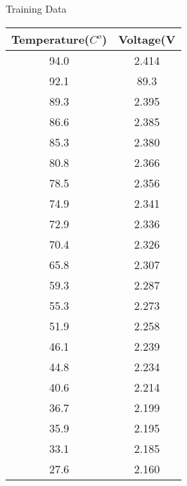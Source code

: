 \documentclass[journal,12pt,onecolumn]{IEEEtran}
\author{EE25BTECH11025\_EE25BTECH11023}
\begin{document}
\maketitle
\begin{center}
Training Data\\
\vspace{0.3cm}
\begin{tabular}[12pt]{|c|c|}
\hline
Temperature($C^o$)&Voltage(V\\
\hline
94.0&2.414\\
\hline
92.1&89.3\\
\hline
89.3&2.395\\
\hline
86.6&2.385\\
\hline
85.3&2.380\\
\hline
80.8&2.366\\
\hline
78.5&2.356\\
\hline
74.9&2.341\\
\hline
72.9&2.336\\
\hline
70.4&2.326\\
\hline
65.8&2.307\\
\hline
59.3&2.287\\
\hline
55.3&2.273\\
\hline
51.9&2.258\\
\hline
46.1&2.239\\
\hline
44.8&2.234\\
\hline
40.6&2.214\\
\hline
36.7&2.199\\
\hline
35.9&2.195\\
\hline
33.1&2.185\\
\hline
27.6&2.160\\
\hline
\end{tabular}\\
\end{center}
\end{document}
